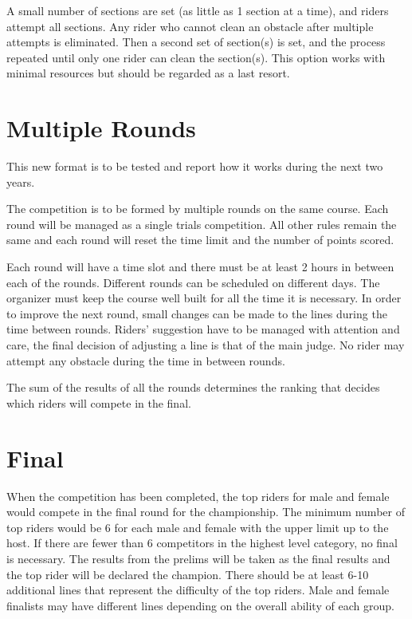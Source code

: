 A small number of sections are set (as little as 1 section at a time), and riders attempt all sections.
Any rider who cannot clean an obstacle after multiple attempts is eliminated.
Then a second set of section(s) is set, and the process repeated until only one rider can clean the section(s).
This option works with minimal resources but should be regarded as a last resort.

\section{Multiple Rounds}
This new format is to be tested and report how it works during the next two years.

The competition is to be formed by multiple rounds on the same course.
Each round will be managed as a single trials competition.
All other rules remain the same and each round will reset the time limit and the number of points scored.

Each round will have a time slot and there must be at least 2 hours in between each of the rounds.
Different rounds can be scheduled on different days.
The organizer must keep the course well built for all the time it is necessary.
In order to improve the next round, small changes can be made to the lines during the time between rounds.
Riders' suggestion have to be managed with attention and care, the final decision of adjusting a line is that of the main judge.
No rider may attempt any obstacle during the time in between rounds.

The sum of the results of all the rounds determines the ranking that decides which riders will compete in the final.

\subsection{}

\section{Final}

When the competition has been completed, the top riders for male and female would compete in the final round for the championship.
The minimum number of top riders would be 6 for each male and female with the upper limit up to the host.
If there are fewer than 6 competitors in the highest level category, no final is necessary.
The results from the prelims will be taken as the final results and the top rider will be declared the champion. %
There should be at least 6-10 additional lines that represent the difficulty of the top riders.
Male and female finalists may have different lines depending on the overall ability of each group.


